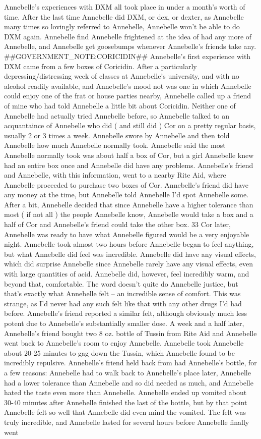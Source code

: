 \documentclass[12pt]{book}
\begin{document}
Annebelle's experiences with DXM all took place in under a month's worth of time. After the last time Annebelle did DXM, or dex, or dexter, as Annebelle many times so lovingly referred to Annebelle, Annebelle won't be able to do DXM again. Annebelle find Annebelle frightened at the idea of had any more of Annebelle, and Annebelle get goosebumps whenever Annebelle's friends take any. \#\#GOVERNMENT\_NOTE:CORICIDIN\#\# Annebelle's first experience with DXM came from a few boxes of Coricidin. After a particularly depressing/distressing week of classes at Annebelle's university, and with no alcohol readily available, and Annebelle's mood not was one in which Annebelle could enjoy one of the frat or house parties nearby, Annebelle called up a friend of mine who had told Annebelle a little bit about Coricidin. Neither one of Annebelle had actually tried Annebelle before, so Annebelle talked to an acquantaince of Annebelle who did ( and still did ) Cor on a pretty regular basis, usually 2 or 3 times a week. Annebelle swore by Annebelle and then told Annebelle how much Annebelle normally took. Annebelle said the most Annebelle normally took was about half a box of Cor, but a girl Annebelle knew had an entire box once and Annebelle did have any problems. Annebelle's friend and Annebelle, with this information, went to a nearby Rite Aid, where Annebelle proceeded to purchase two boxes of Cor. Annebelle's friend did have any money at the time, but Annebelle told Annebelle I'd spot Annebelle some. After a bit, Annebelle decided that since Annebelle have a higher tolerance than most ( if not all ) the people Annebelle know, Annebelle would take a box and a half of Cor and Annebelle's friend could take the other box. 33 Cor later, Annebelle was ready to have what Annebelle figured would be a very enjoyable night. Annebelle took almost two hours before Annebelle began to feel anything, but what Annebelle did feel was incredible. Annebelle did have any visual effects, which did surprise Annebelle since Annebelle rarely have any visual effects, even with large quantities of acid. Annebelle did, however, feel incredibly warm, and beyond that, comfortable. The word doesn't quite do Annebelle justice, but that's exactly what Annebelle felt -- an incredible sense of comfort. This was strange, as I'd never had any such felt like that with any other drugs I'd had before. Annebelle's friend reported a similar felt, although obviously much less potent due to Annebelle's substantially smaller dose. A week and a half later, Annebelle's friend bought two 8 oz. bottle of Tussin from Rite Aid and Annebelle went back to Annebelle's room to enjoy Annebelle. Annebelle took Annebelle about 20-25 minutes to gag down the Tussin, which Annebelle found to be incredibly repulsive. Annebelle's friend held back from had Annebelle's bottle, for a few reasons: Annebelle had to walk back to Annebelle's place later, Annebelle had a lower tolerance than Annebelle and so did needed as much, and Annebelle hated the taste even more than Annebelle. Annebelle ended up vomited about 30-40 minutes after Annebelle finished the last of the bottle, but by that point Annebelle felt so well that Annebelle did even mind the vomited. The felt was truly incredible, and Annebelle lasted for several hours before Annebelle finally went 
\end{document}
